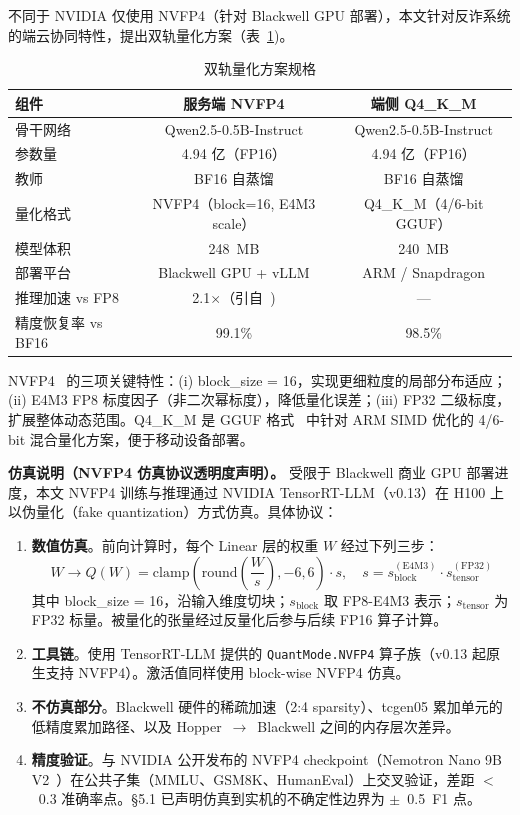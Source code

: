 \documentclass[UTF8,a4paper,10pt,twocolumn]{ctexart}
\theoremstyle{plain}
\begin{document}
不同于 NVIDIA 仅使用 NVFP4（针对 Blackwell GPU 部署），本文针对反诈系统的端云协同特性，提出双轨量化方案（表~\ref{tab:dual_track})。

\begin{table}[H]
\centering
\caption{双轨量化方案规格}
\label{tab:dual_track}
\small
\begin{tabular}{lcc}
\toprule
组件 & 服务端 NVFP4 & 端侧 Q4\_K\_M \\
\midrule
骨干网络 & Qwen2.5-0.5B-Instruct & Qwen2.5-0.5B-Instruct \\
参数量 & 4.94 亿（FP16） & 4.94 亿（FP16） \\
教师 & BF16 自蒸馏 & BF16 自蒸馏 \\
量化格式 & NVFP4（block=16, E4M3 scale） & Q4\_K\_M（4/6-bit GGUF） \\
模型体积 & 248~MB & 240~MB \\
部署平台 & Blackwell GPU + vLLM & ARM / Snapdragon \\
推理加速 vs FP8 & 2.1$\times$（引自~\cite{xin2026qad}) & --- \\
精度恢复率 vs BF16 & 99.1\% & 98.5\% \\
\bottomrule
\end{tabular}
\end{table}

NVFP4~\cite{xin2026qad} 的三项关键特性：(i) block\_size = 16，实现更细粒度的局部分布适应；(ii) E4M3 FP8 标度因子（非二次幂标度），降低量化误差；(iii) FP32 二级标度，扩展整体动态范围。Q4\_K\_M 是 GGUF 格式~\cite{gerganov2024gguf} 中针对 ARM SIMD 优化的 4/6-bit 混合量化方案，便于移动设备部署。

\textbf{仿真说明（NVFP4 仿真协议透明度声明）。} 受限于 Blackwell 商业 GPU 部署进度，本文 NVFP4 训练与推理通过 NVIDIA TensorRT-LLM（v0.13）在 H100 上以伪量化（fake quantization）方式仿真。具体协议：

\begin{enumerate}[label=(\roman*)]
\item \textbf{数值仿真}。前向计算时，每个 Linear 层的权重 $W$ 经过下列三步：
\begin{equation*}
W \to Q(W) = \mathrm{clamp}\left( \mathrm{round}\left(\frac{W}{s}\right), -6, 6 \right) \cdot s, \quad s = s_{\mathrm{block}}^{\mathrm{(E4M3)}} \cdot s_{\mathrm{tensor}}^{\mathrm{(FP32)}}
\end{equation*}
其中 block\_size = 16，沿输入维度切块；$s_{\mathrm{block}}$ 取 FP8-E4M3 表示；$s_{\mathrm{tensor}}$ 为 FP32 标量。被量化的张量经过反量化后参与后续 FP16 算子计算。
\item \textbf{工具链}。使用 TensorRT-LLM 提供的 \texttt{QuantMode.NVFP4} 算子族（v0.13 起原生支持 NVFP4）。激活值同样使用 block-wise NVFP4 仿真。
\item \textbf{不仿真部分}。Blackwell 硬件的稀疏加速（2:4 sparsity）、tcgen05 累加单元的低精度累加路径、以及 Hopper~$\to$~Blackwell 之间的内存层次差异。
\item \textbf{精度验证}。与 NVIDIA 公开发布的 NVFP4 checkpoint（Nemotron Nano 9B V2~\cite{xin2026qad}）在公共子集（MMLU、GSM8K、HumanEval）上交叉验证，差距 $<$~0.3 准确率点。\S5.1 已声明仿真到实机的不确定性边界为 $\pm$~0.5~F1 点。
\end{enumerate}
\end{document}
